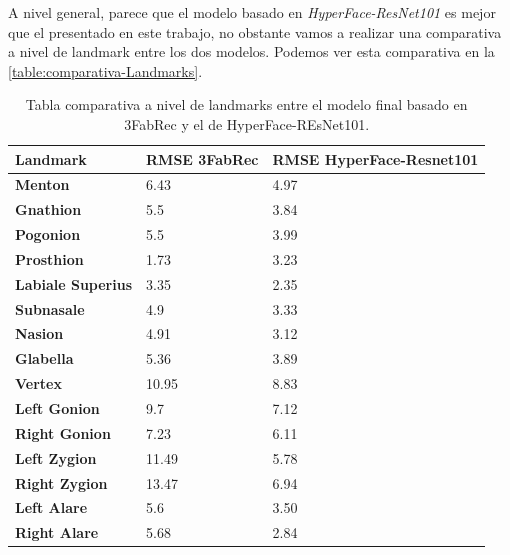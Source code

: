             \noindent A nivel general, parece que el modelo basado en \textit{HyperFace-ResNet101} es mejor que el presentado en este trabajo, no obstante vamos a realizar una comparativa a nivel de landmark entre los dos modelos. Podemos ver esta comparativa en la \autoref{table:comparativa-Landmarks}.
            \begin{table}[!ht]
                \centering
                \caption{Tabla comparativa a nivel de landmarks entre el modelo final basado en 3FabRec y el de HyperFace-REsNet101.}
                \begin{tabular}{|l|l|l|}
                \hline
                    \cellcolor{gray!25}\textbf{Landmark} & \cellcolor{gray!25}\textbf{RMSE 3FabRec} & \cellcolor{gray!25}\textbf{RMSE HyperFace-Resnet101} \\ \hline
                    \textbf{Menton} & 6.43 & \cellcolor{green!25} 4.97 \\ \hline
                    \textbf{Gnathion} & 5.5 & \cellcolor{green!25}3.84 \\ \hline
                    \textbf{Pogonion} & 5.5 & \cellcolor{green!25}3.99 \\ \hline
                    \textbf{Prosthion} & \cellcolor{green!25}1.73 & 3.23 \\ \hline
                    \textbf{Labiale Superius} & 3.35 & \cellcolor{green!25}2.35 \\ \hline
                    \textbf{Subnasale} & 4.9 & \cellcolor{green!25}3.33 \\ \hline
                    \textbf{Nasion} & 4.91 & \cellcolor{green!25}3.12 \\ \hline
                    \textbf{Glabella} & 5.36 & \cellcolor{green!25}3.89 \\ \hline
                    \textbf{Vertex} & 10.95 & \cellcolor{green!25}8.83 \\ \hline
                    \textbf{Left Gonion} & 9.7 & \cellcolor{green!25}7.12 \\ \hline
                    \textbf{Right Gonion} & 7.23 & \cellcolor{green!25}6.11 \\ \hline
                    \textbf{Left Zygion} & 11.49 & \cellcolor{green!25}5.78 \\ \hline
                    \textbf{Right Zygion} & 13.47 & \cellcolor{green!25}6.94 \\ \hline
                    \textbf{Left Alare} & 5.6 & \cellcolor{green!25}3.50 \\ \hline
                    \textbf{Right Alare} & 5.68 & \cellcolor{green!25}2.84 \\ \hline

\end{tabular}
\end{table}
